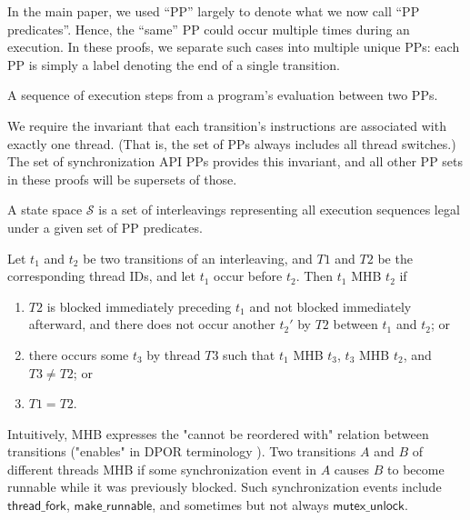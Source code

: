 In the main paper, we used ``PP'' largely to denote what we now call ``PP predicates''.
Hence, the ``same'' PP could occur multiple times during an execution.
In these proofs, we separate such cases into multiple unique PPs: each PP is simply a label denoting the end of a single transition.

\begin{definition}[Transition]
A sequence of execution steps from a program's evaluation between two PPs.
\label{def:transition}

\end{definition}
We require the invariant that each transition's instructions are associated with exactly one thread. (That is, the set of PPs always includes all thread switches.)
The set of synchronization API PPs provides this invariant, and all other PP sets in these proofs will be supersets of those.

\begin{definition}
	A state space $\mathcal{S}$ is a set of interleavings representing all execution sequences legal under a given set of PP predicates.
\end{definition}

\begin{definition}[Must-happen-before (MHB)]
Let $t_1$ and $t_2$ be two transitions of an interleaving, and $T1$ and $T2$ be the corresponding thread IDs,
and let $t_1$ occur before $t_2$.
Then $t_1$ MHB $t_2$ if
\begin{enumerate}
	\item $T2$ is blocked immediately preceding $t_1$ and not blocked immediately afterward,
		and there does not occur another $t_2'$ by $T2$ between $t_1$ and $t_2$; or
	\item there occurs some $t_3$ by thread $T3$ such that $t_1$ MHB $t_3$, $t_3$ MHB $t_2$, and $T3 \ne T2$; or
	\item $T1 = T2$.
\end{enumerate}
\end{definition}

Intuitively, MHB expresses the "cannot be reordered with" relation between transitions
("enables" in DPOR terminology \cite{dpor}).
Two transitions $A$ and $B$ of different threads MHB if some synchronization event in $A$ causes $B$ to become runnable while it was previously blocked.
Such synchronization events include $\mathsf{thread\_fork}$, $\mathsf{make\_runnable}$,
and sometimes but not always $\mathsf{mutex\_unlock}$.

